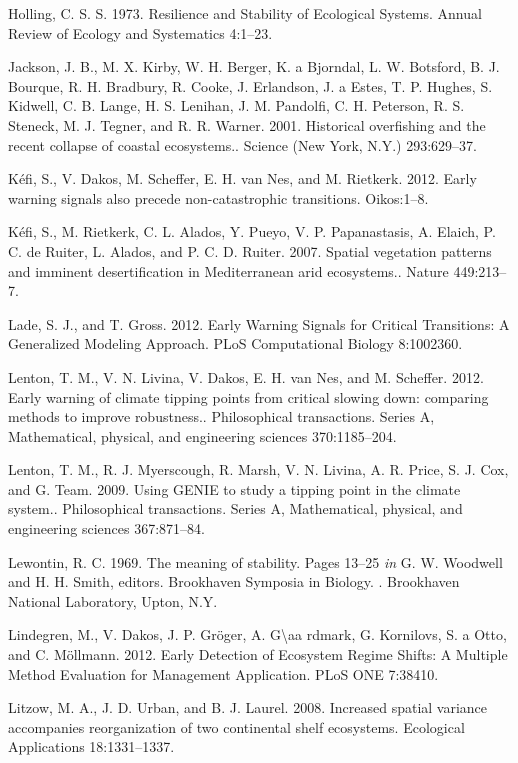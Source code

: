 \documentclass{article}
\begin{document}
Holling, C. S. S. 1973. Resilience and Stability of Ecological Systems.
Annual Review of Ecology and Systematics 4:1--23.

Jackson, J. B., M. X. Kirby, W. H. Berger, K. a Bjorndal, L. W.
Botsford, B. J. Bourque, R. H. Bradbury, R. Cooke, J. Erlandson, J. a
Estes, T. P. Hughes, S. Kidwell, C. B. Lange, H. S. Lenihan, J. M.
Pandolfi, C. H. Peterson, R. S. Steneck, M. J. Tegner, and R. R. Warner.
2001. Historical overfishing and the recent collapse of coastal
ecosystems.. Science (New York, N.Y.) 293:629--37.

Kéfi, S., V. Dakos, M. Scheffer, E. H. van Nes, and M. Rietkerk. 2012.
Early warning signals also precede non-catastrophic transitions.
Oikos:1--8.

Kéfi, S., M. Rietkerk, C. L. Alados, Y. Pueyo, V. P. Papanastasis, A.
Elaich, P. C. de Ruiter, L. Alados, and P. C. D. Ruiter. 2007. Spatial
vegetation patterns and imminent desertification in Mediterranean arid
ecosystems.. Nature 449:213--7.

Lade, S. J., and T. Gross. 2012. Early Warning Signals for Critical
Transitions: A Generalized Modeling Approach. PLoS Computational Biology
8:1002360.

Lenton, T. M., V. N. Livina, V. Dakos, E. H. van Nes, and M. Scheffer.
2012. Early warning of climate tipping points from critical slowing
down: comparing methods to improve robustness.. Philosophical
transactions. Series A, Mathematical, physical, and engineering sciences
370:1185--204.

Lenton, T. M., R. J. Myerscough, R. Marsh, V. N. Livina, A. R. Price, S.
J. Cox, and G. Team. 2009. Using GENIE to study a tipping point in the
climate system.. Philosophical transactions. Series A, Mathematical,
physical, and engineering sciences 367:871--84.

Lewontin, R. C. 1969. The meaning of stability. Pages 13--25 \emph{in}
G. W. Woodwell and H. H. Smith, editors. Brookhaven Symposia in Biology.
. Brookhaven National Laboratory, Upton, N.Y.

Lindegren, M., V. Dakos, J. P. Gröger, A. G\textbackslash{}aa rdmark, G.
Kornilovs, S. a Otto, and C. Möllmann. 2012. Early Detection of
Ecosystem Regime Shifts: A Multiple Method Evaluation for Management
Application. PLoS ONE 7:38410.

Litzow, M. A., J. D. Urban, and B. J. Laurel. 2008. Increased spatial
variance accompanies reorganization of two continental shelf ecosystems.
Ecological Applications 18:1331--1337.
\end{document}
